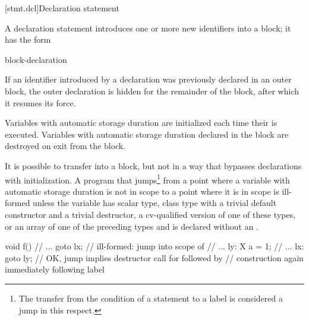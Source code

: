 [stmt.dcl]{Declaration statement}%

\pnum
A declaration statement introduces one or more new identifiers into a
block; it has the form

\begin{bnf}
\br
    block-declaration
\end{bnf}

If an identifier introduced by a declaration was previously declared in
an outer block,
%
%
%
the outer declaration is hidden for the remainder of the block, after
which it resumes its force.

\pnum
{}%
%
Variables with automatic storage duration are
initialized each time their  is executed.
%
Variables with automatic storage duration declared in the block are
destroyed on exit from the block.

\pnum
{}%
%
It is possible to transfer into a block, but not in a way that bypasses
declarations with initialization. A program that jumps\footnote{The transfer from the condition of a  statement to a
 label is considered a jump in this respect.}
from a point where a variable with automatic storage duration is
not in scope to a point where it is in scope is ill-formed unless the
variable has scalar type, class type with a trivial default constructor and a trivial destructor, a cv-qualified version of one of these types, or an array of one of the preceding types and is declared without an
.
\begin{example}

\begin{codeblock}
void f() {
  // ...
  goto lx;          // ill-formed: jump into scope of 
  // ...
ly:
  X a = 1;
  // ...
lx:
  goto ly;          // OK, jump implies destructor call for  followed by
                    // construction again immediately following label 
}
\end{codeblock}
\end{example}

